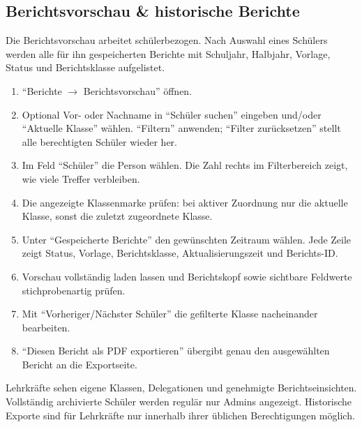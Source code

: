 \documentclass[12pt,a4paper]{article}
\begin{document}
\subsection{Berichtsvorschau \& historische Berichte}\label{sec:berichtsvorschau}
Die Berichtsvorschau arbeitet schülerbezogen. Nach Auswahl eines Schülers werden alle für ihn gespeicherten Berichte mit Schuljahr, Halbjahr, Vorlage, Status und Berichtsklasse aufgelistet.
\begin{enumerate}
  \item \enquote{Berichte \(\rightarrow\) Berichtsvorschau} öffnen.
  \item Optional Vor- oder Nachname in \enquote{Schüler suchen} eingeben und/oder \enquote{Aktuelle Klasse} wählen. \enquote{Filtern} anwenden; \enquote{Filter zurücksetzen} stellt alle berechtigten Schüler wieder her.
  \item Im Feld \enquote{Schüler} die Person wählen. Die Zahl rechts im Filterbereich zeigt, wie viele Treffer verbleiben.
  \item Die angezeigte Klassenmarke prüfen: bei aktiver Zuordnung nur die aktuelle Klasse, sonst die zuletzt zugeordnete Klasse.
  \item Unter \enquote{Gespeicherte Berichte} den gewünschten Zeitraum wählen. Jede Zeile zeigt Status, Vorlage, Berichtsklasse, Aktualisierungszeit und Berichts-ID.
  \item Vorschau vollständig laden lassen und Berichtskopf sowie sichtbare Feldwerte stichprobenartig prüfen.
  \item Mit \enquote{Vorheriger/Nächster Schüler} die gefilterte Klasse nacheinander bearbeiten.
  \item \enquote{Diesen Bericht als PDF exportieren} übergibt genau den ausgewählten Bericht an die Exportseite.
\end{enumerate}

Lehrkräfte sehen eigene Klassen, Delegationen und genehmigte Berichtseinsichten. Vollständig archivierte Schüler werden regulär nur Admins angezeigt. Historische Exporte sind für Lehrkräfte nur innerhalb ihrer üblichen Berechtigungen möglich.
\end{document}
